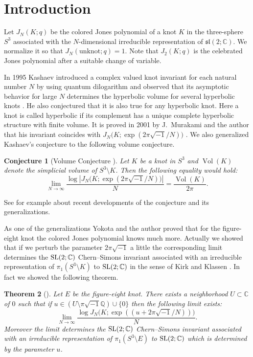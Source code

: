 \documentclass[a4paper]{amsart}
\theoremstyle{plain}
\newtheorem{thm}{Theorem}[section]
\newtheorem{conj}[thm]{Conjecture}
\theoremstyle{definition}
\theoremstyle{remark}
\newcommand{\C}{\mathbb{C}}
\newcommand{\Q}{\mathbb{Q}}
\newcommand{\Vol}{\operatorname{Vol}}
\newcommand{\SL}{\rm{SL}}
\numberwithin{equation}{section}
\begin{document}
\section{Introduction}
Let $J_N(K;q)$ be the colored Jones polynomial of a knot $K$ in the three-sphere $S^3$ associated with the $N$-dimensional irreducible representation of $\mathfrak{sl}(2;\C)$.
We normalize it so that $J_N(\text{unknot};q)=1$.
Note that $J_2(K;q)$ is the celebrated Jones polynomial \cite{Jones:BULAM385} after a suitable change of variable.
\par
In 1995 Kashaev introduced a complex valued knot invariant for each natural number $N$ by using quantum dilogarithm \cite{Kashaev:MODPLA95} and observed that its asymptotic behavior for large $N$ determines the hyperbolic volume for several hyperbolic knots \cite{Kashaev:LETMP97}.
He also conjectured that it is also true for any hyperbolic knot.
Here a knot is called hyperbolic if its complement has a unique complete hyperbolic structure with finite volume.
It is proved in 2001 by J.~Murakami and the author that his invariant coincides with $J_N\bigl(K;\exp(2\pi\sqrt{-1}/N)\bigr)$ \cite{Murakami/Murakami:ACTAM12001}.
We also generalized Kashaev's conjecture to the following volume conjecture.
\begin{conj}[Volume Conjecture \cite{Kashaev:LETMP97,Murakami/Murakami:ACTAM12001}]
Let $K$ be a knot in $S^3$ and $\Vol(K)$ denote the simplicial volume of $S^3\setminus{K}$.
Then the following equality would hold:
\begin{equation}\label{eq:VC}
  \lim_{N\to\infty}
  \frac{\log\left|J_N\bigl(K;\exp(2\pi\sqrt{-1}/N)\bigr)\right|}{N}
  =
  \frac{\Vol(K)}{2\pi}.
\end{equation}
\end{conj}
See for example \cite{Murakami:Columbia} about recent developments of the conjecture and its generalizations.
\par
As one of the  generalizations Yokota and the author \cite{Murakami/Yokota:JREIA2007} proved that for the figure-eight knot the colored Jones polynomial knows much more.
Actually we showed that if we perturb the parameter $2\pi\sqrt{-1}$ a little the corresponding limit determines the $\SL(2;\C)$ Chern--Simons invariant associated with an irreducible representation of $\pi_1(S^3\setminus{K})$ to $\SL(2;\C)$ in the sense of Kirk and Klassen \cite{Kirk/Klassen:COMMP93}.
In fact we showed the following theorem.
\begin{thm}[\cite{Murakami/Yokota:JREIA2007}]\label{thm:Murakami/Yokota}
Let $E$ be the figure-eight knot.
There exists a neighborhood $U\subset\C$ of $0$ such that if $u\in(U\setminus{\pi\sqrt{-1}\Q})\cup\{0\}$ then the following limit exists:
\begin{equation*}
  \lim_{N\to\infty}
  \frac{\log J_N\bigl(K;\exp((u+2\pi\sqrt{-1}/N))\bigr)}{N}.
\end{equation*}
Moreover the limit determines the $\SL(2;\C)$ Chern--Simons invariant associated with an irreducible representation of $\pi_1(S^3\setminus{E})$ to $\SL(2;\C)$ which is determined by the parameter $u$.
\end{thm}
\end{document}
